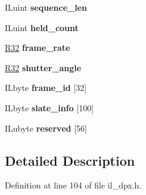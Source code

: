 \begin{DoxyCompactItemize}
\mbox{\label{structDPX__MOTION__PICTURE__HEAD_a4b7b7f42283af459e594bc655d319242}} 
I\+Luint {\bfseries sequence\+\_\+len}
\item 
\mbox{\label{structDPX__MOTION__PICTURE__HEAD_a08d15bd6d23e5587f5a97465bc954e08}} 
I\+Luint {\bfseries held\+\_\+count}
\item 
\mbox{\label{structDPX__MOTION__PICTURE__HEAD_a381a6906a56afec4fb656033e31f04ec}} 
\hyperlink{structR32}{R32} {\bfseries frame\+\_\+rate}
\item 
\mbox{\label{structDPX__MOTION__PICTURE__HEAD_a09837da88c276d4c183290e19554d53d}} 
\hyperlink{structR32}{R32} {\bfseries shutter\+\_\+angle}
\item 
\mbox{\label{structDPX__MOTION__PICTURE__HEAD_a9110f99121fa22e76a2a80944c3945f6}} 
I\+Lbyte {\bfseries frame\+\_\+id} \mbox{[}32\mbox{]}
\item 
\mbox{\label{structDPX__MOTION__PICTURE__HEAD_a14e0f929c8f19b6e5e7f46ed9fcfaf1d}} 
I\+Lbyte {\bfseries slate\+\_\+info} \mbox{[}100\mbox{]}
\item 
\mbox{\label{structDPX__MOTION__PICTURE__HEAD_ae9fc679bdb82811473f8f9384d089724}} 
I\+Lubyte {\bfseries reserved} \mbox{[}56\mbox{]}
\end{DoxyCompactItemize}


\subsection{Detailed Description}


Definition at line 104 of file il\+\_\+dpx.\+h.



